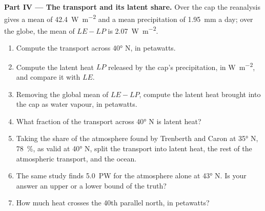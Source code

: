 \begin{problem}
\medskip
\noindent\textbf{Part IV --- The transport and its latent share.} Over the cap the
reanalysis gives a mean  of \qty{42.4}{W.m^{-2}} and a mean
precipitation of \qty{1.95}{mm} a day; over the globe, the mean of $LE - LP$ is
\qty{2.07}{W.m^{-2}}.
\begin{enumerate}[resume]
  \item Compute the transport across \ang{40} N, in petawatts.
  \item Compute the latent heat $LP$ released by the cap's precipitation, in
        \unit{W.m^{-2}}, and compare it with $LE$.
  \item Removing the global mean of $LE - LP$, compute the latent heat brought into
        the cap as water vapour, in petawatts.
  \item What fraction of the transport across \ang{40} N is latent heat?
  \item Taking the share of the atmosphere found by Trenberth and Caron at \ang{35} N,
        \qty{78}{\percent}, as valid at \ang{40} N, split the transport into
        latent heat, the rest of the atmospheric transport, and the ocean.
  \item The same study finds \qty{5.0}{PW} for the atmosphere alone at
        \ang{43} N. Is your answer an upper or a lower bound of the truth?
  \item How much heat crosses the 40th parallel north, in petawatts?
\end{enumerate}
\end{problem}
